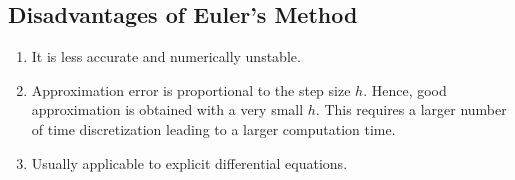\documentclass[../main-sheet.tex]{subfiles}
\begin{document}
    \subsection{Disadvantages of Euler's Method}
    \begin{enumerate}
        \item It is less accurate and numerically unstable.
        \item Approximation error is proportional to the step size \(h\).
        Hence, good approximation is obtained with a very small \(h\).
        This requires a larger number of time discretization leading to a larger computation time.
        \item Usually applicable to explicit differential equations.
    \end{enumerate}
\end{document}

